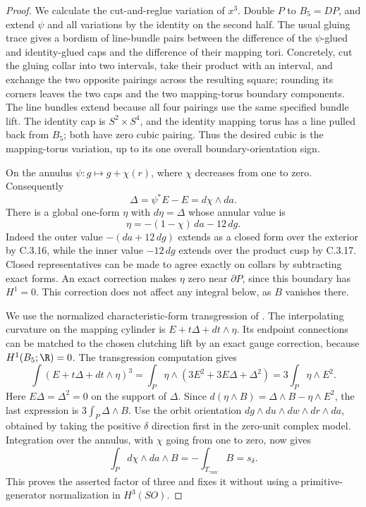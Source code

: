 \begin{proof}
We calculate the cut-and-reglue variation of $x^3$. Double $P$
to $B_5=DP$, and extend $\psi$ and all variations by the identity
on the second half. The usual gluing trace gives a bordism of
line-bundle pairs between the difference of the $\psi$-glued
and identity-glued caps and the difference of their mapping
tori. Concretely, cut the gluing collar into two intervals,
take their product with an interval, and exchange the two
opposite pairings across the resulting square; rounding its
corners leaves the two caps and the two mapping-torus boundary
components. The line bundles extend because all four pairings
use the same specified bundle lift. The identity cap is
$S^2\times S^4$, and the identity mapping torus has a line
pulled back from $B_5$; both have zero cubic pairing. Thus the
desired cubic is the mapping-torus variation, up to its one
overall boundary-orientation sign.

On the annulus $\psi:g\mapsto g+\chi(r)$, where $\chi$ decreases
from one to zero. Consequently
\[
 \Delta=\psi^*E-E=d\chi\wedge da.
\]
There is a global one-form $\eta$ with $d\eta=\Delta$ whose
annular value is
\[
 \eta=-(1-\chi)\,da-12\,dg.
\]
Indeed the outer value $-(da+12\,dg)$ extends as a closed form
over the exterior by C.3.16, while the inner value $-12\,dg$
extends over the product cusp by C.3.17. Closed representatives
can be made to agree exactly on collars by subtracting exact
forms. An exact correction makes $\eta$ zero near $\partial P$,
since this boundary has $H^1=0$. This correction does not affect
any integral below, as $B$ vanishes there.

We use the normalized characteristic-form transgression of
\citet[Section 3, Propositions 3.2 and 3.8]{ChernSimons1974E}.
The interpolating curvature on the mapping cylinder is
$E+t\Delta+dt\wedge\eta$. Its endpoint connections can be
matched to the chosen clutching lift by an exact gauge correction,
because $H^1(B_5;\R)=0$. The transgression computation gives
\[
 \int(E+t\Delta+dt\wedge\eta)^3
 =\int_P\eta\wedge(3E^2+3E\Delta+\Delta^2)
 =3\int_P\eta\wedge E^2.
\]
Here $E\Delta=\Delta^2=0$ on the support of $\Delta$. Since
$d(\eta\wedge B)=\Delta\wedge B-\eta\wedge E^2$,
the last expression is $3\int_P\Delta\wedge B$.
Use the orbit orientation
$dg\wedge du\wedge dw\wedge dr\wedge da$, obtained by
taking the positive $\delta$ direction first in the zero-unit
complex model. Integration over the annulus, with $\chi$ going
from one to zero, now gives
\[
 \int_P d\chi\wedge da\wedge B
   =-\int_{T_{\gamma uw}}B=s_\delta.
\]
This proves the asserted factor of three and fixes it without
using a primitive-generator normalization in $H^3(SO)$.


\end{proof}
